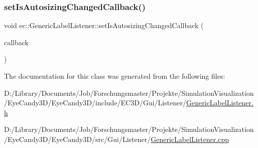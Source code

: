 \subsubsection{\texorpdfstring{set\+Is\+Autosizing\+Changed\+Callback()}{setIsAutosizingChangedCallback()}}
{\footnotesize\ttfamily void ec\+::\+Generic\+Label\+Listener\+::set\+Is\+Autosizing\+Changed\+Callback (\begin{DoxyParamCaption}\item[{const \mbox{\hyperlink{classec_1_1_generic_label_listener_adf4cec1bd13682ce66c52f0484fe46c6}{Is\+Autosizing\+Changed\+\_\+\+Callback}} \&}]{callback }\end{DoxyParamCaption})}



The documentation for this class was generated from the following files\+:\begin{DoxyCompactItemize}
\item 
D\+:/\+Library/\+Documents/\+Job/\+Forschungsmaster/\+Projekte/\+Simulation\+Visualization/\+Eye\+Candy3\+D/\+Eye\+Candy3\+D/include/\+E\+C3\+D/\+Gui/\+Listener/\mbox{\hyperlink{_generic_label_listener_8h}{Generic\+Label\+Listener.\+h}}\item 
D\+:/\+Library/\+Documents/\+Job/\+Forschungsmaster/\+Projekte/\+Simulation\+Visualization/\+Eye\+Candy3\+D/\+Eye\+Candy3\+D/src/\+Gui/\+Listener/\mbox{\hyperlink{_generic_label_listener_8cpp}{Generic\+Label\+Listener.\+cpp}}\end{DoxyCompactItemize}
